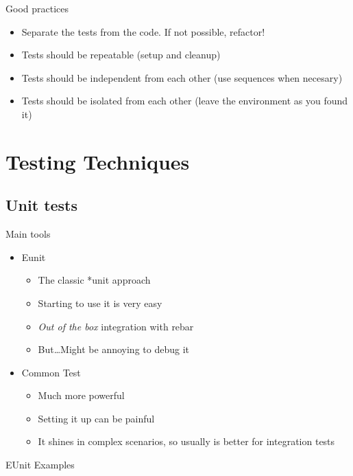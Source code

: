 \documentclass[pdf]{beamer}
\begin{document}
\begin{frame}{Good practices}
    \begin{itemize}
    \item Separate the tests from the code. If not possible, refactor!
    \item Tests should be repeatable (setup and cleanup)
    \item Tests should be independent from each other (use sequences when necesary)
    \item Tests should be isolated from each other (leave the environment as you found it)
    \end{itemize}
\end{frame}



\section{Testing Techniques}

\subsection*{Unit tests}
\label{unit_testing}

\begin{frame}{Main tools}
    \begin{itemize}
    \item Eunit
        \begin{itemize}
        \item The classic *unit approach
        \item Starting to use it is very easy
        \item \emph{Out of the box} integration with rebar
        \item But\dots Might be annoying to debug it
        \end{itemize}
    \item Common Test
        \begin{itemize}
        \item Much more powerful
        \item Setting it up can be painful
        \item It shines in complex scenarios, so usually is better for integration tests
        \end{itemize}
    \end{itemize}
\end{frame}

\begin{frame}{EUnit Examples}
\end{frame}
\end{document}
